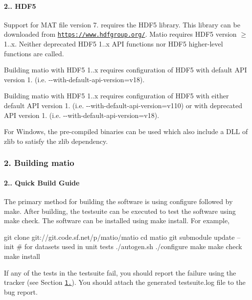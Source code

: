 \paragraph*{2.. H\+D\+F5}

Support for M\+AT file version 7. requires the H\+D\+F5 library. This library can be downloaded from \href{https://www.hdfgroup.org/}{\tt https\+://www.\+hdfgroup.\+org/}. Matio requires H\+D\+F5 version {$\ge$} 1..\+x. Neither deprecated H\+D\+F5 1..\+x A\+PI functions nor H\+D\+F5 higher-\/level functions are called.


\begin{DoxyItemize}
\item Building matio with H\+D\+F5 1..\+x requires configuration of H\+D\+F5 with default A\+PI version 1. (i.\+e. {\ttfamily -\/-\/with-\/default-\/api-\/version=v18}).
\item Building matio with H\+D\+F5 1..\+x requires configuration of H\+D\+F5 with either default A\+PI version 1. (i.\+e. {\ttfamily -\/-\/with-\/default-\/api-\/version=v110}) or with deprecated A\+PI version 1. (i.\+e. {\ttfamily -\/-\/with-\/default-\/api-\/version=v18}).
\end{DoxyItemize}

For Windows, the pre-\/compiled binaries can be used which also include a D\+LL of zlib to satisfy the zlib dependency.

\subsubsection*{2. Building matio}

\paragraph*{2.. Quick Build Guide}

The primary method for building the software is using {\ttfamily configure} followed by {\ttfamily make}. After building, the testsuite can be executed to test the software using {\ttfamily make check}. The software can be installed using {\ttfamily make install}. For example, 
\begin{DoxyCode}
git clone git://git.code.sf.net/p/matio/matio
cd matio
git submodule update --init  # for datasets used in unit tests
./autogen.sh
./configure
make
make check
make install
\end{DoxyCode}
 If any of the tests in the testsuite fail, you should report the failure using the tracker (see Section \href{#14-questions-and-reporting-bugs}{\tt 1.}). You should attach the generated testsuite.\+log file to the bug report.

